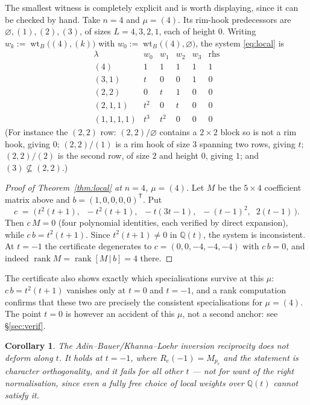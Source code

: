 \documentclass[11pt]{article}
\newtheorem{corollary}[theorem]{Corollary}
\theoremstyle{definition}
\theoremstyle{remark}
\newcommand{\Q}{\mathbb{Q}}
\newcommand{\Mult}[1]{M_{#1}}
\newcommand{\wtB}{\operatorname{wt}_B}
\begin{document}
The smallest witness is completely explicit and is worth displaying, since it can be checked
by hand.  Take $n=4$ and $\mu=(4)$.  Its rim-hook predecessors are
$\varnothing,(1),(2),(3)$, of sizes $L=4,3,2,1$, each of height $0$.  Writing
$w_k:=\wtB\bigl((4),(k)\bigr)$ with $w_0:=\wtB\bigl((4),\varnothing\bigr)$, the system
\eqref{eq:local} is
\[
\begin{array}{l|cccc|c}
 \lambda & w_0 & w_1 & w_2 & w_3 & \text{rhs}\\\hline
 (4)        & 1   & 1   & 1   & 1 & 1\\
 (3,1)      & t   & 0   & 0   & 1 & 0\\
 (2,2)      & 0   & t   & 1   & 0 & 0\\
 (2,1,1)    & t^2 & 0   & t   & 0 & 0\\
 (1,1,1,1)  & t^3 & t^2 & 0   & 0 & 0
\end{array}
\]
(For instance the $(2,2)$ row: $(2,2)/\varnothing$ contains a $2\times2$ block so is not a rim
hook, giving $0$; $(2,2)/(1)$ is a rim hook of size $3$ spanning two rows, giving $t$;
$(2,2)/(2)$ is the second row, of size $2$ and height $0$, giving $1$; and $(3)\not\subseteq(2,2)$.)

\begin{proof}[Proof of Theorem~\ref{thm:local} at $n=4$, $\mu=(4)$]
Let $M$ be the $5\times4$ coefficient matrix above and $b=(1,0,0,0,0)^{\mathsf T}$.  Put
\[
  c\;=\;\bigl(\,t^2(t+1),\;\;-t^2(t+1),\;\;-t(3t-1),\;\;-(t-1)^2,\;\;2(t-1)\,\bigr).
\]
Then $c\,M=0$ (four polynomial identities, each verified by direct expansion), while
$c\,b=t^{2}(t+1)$.  Since $t^{2}(t+1)\ne0$ in $\Q(t)$, the system is inconsistent.
At $t=-1$ the certificate degenerates to $c=(0,0,-4,-4,-4)$ with $c\,b=0$, and indeed
$\operatorname{rank}M=\operatorname{rank}[M\,|\,b]=4$ there.
\end{proof}

The certificate also shows exactly which specialisations survive at this $\mu$:
$c\,b=t^2(t+1)$ vanishes only at $t=0$ and $t=-1$, and a rank computation confirms that these
two are precisely the consistent specialisations for $\mu=(4)$.  The point $t=0$ is however an
accident of this $\mu$, not a second anchor: see \S\ref{sec:verif}.

\begin{corollary}\label{cor:answer}
The Adin--Bauer/Khanna--Loehr inversion reciprocity does not deform along $t$.  It holds at
$t=-1$, where $R_e(-1)=\Mult{p_e}$ and the statement is character orthogonality, and it fails
for all other $t$ --- not for want of the right normalisation, since even a fully free choice
of local weights over $\Q(t)$ cannot satisfy it.
\end{corollary}
\end{document}
